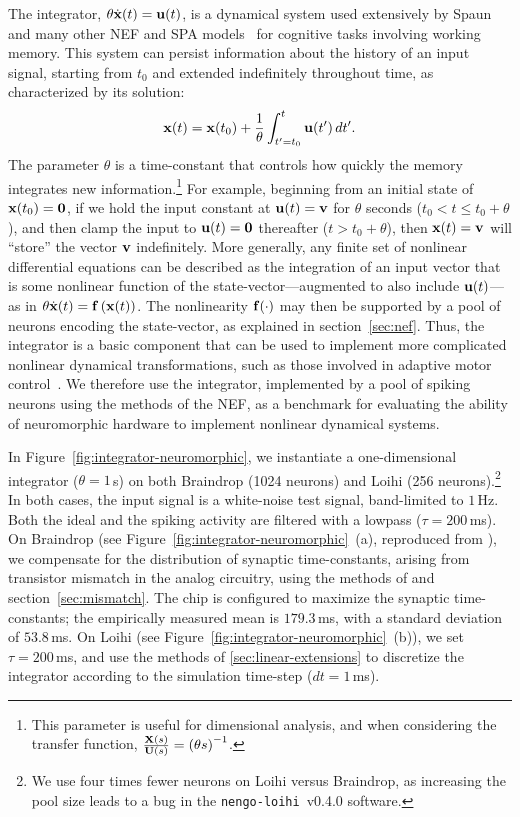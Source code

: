 The integrator, $\theta \dot{\mathbf{x}}(t) = \mathbf{u}(t)$, is a dynamical system used extensively by Spaun~\citep{eliasmith2012} and many other NEF and SPA models~\citep[][to name a few]{singh2004, trujillo2014a, rasmussen2017} for cognitive tasks involving working memory.
This system can persist information about the history of an input signal, starting from $t_0$ and extended indefinitely throughout time, as characterized by its solution:
$$\mathbf{x}(t) = \mathbf{x}(t_0) + \frac{1}{\theta} \int_{t'=t_0}^{t} \mathbf{u}(t')\, dt' \text{.}$$
The parameter $\theta$ is a time-constant that controls how quickly the memory integrates new information.\footnote{
This parameter is useful for dimensional analysis, and when considering the transfer function, $\frac{\mathbf{X}(s)}{\mathbf{U}(s)} = \left( \theta s \right)^{-1}$.}
For example, beginning from an initial state of $\mathbf{x}(t_0) = \mathbf{0}$, if we hold the input constant at $\mathbf{u}(t) = \mathbf{v}$ for $\theta$ seconds ($t_0 < t \le t_0 + \theta$), and then clamp the input to $\mathbf{u}(t) = \mathbf{0}$ thereafter ($t > t_0 + \theta$), then $\mathbf{x}(t) = \mathbf{v}$ will ``store'' the vector $\mathbf{v}$ indefinitely.
More generally, any finite set of nonlinear differential equations can be described as the integration of an input vector that is some nonlinear function of the state-vector---augmented to also include $\mathbf{u}(t)$---as in $\theta \dot{\mathbf{x}}(t) = \mathbf{f}\left({\mathbf{x}(t)}\right)$.
The nonlinearity $\mathbf{f}(\cdot)$ may then be supported by a pool of neurons encoding the state-vector, as explained in section~\ref{sec:nef}.
Thus, the integrator is a basic component that can be used to implement more complicated nonlinear dynamical transformations, such as those involved in adaptive motor control~\citep{dewolf2016}.
We therefore use the integrator, implemented by a pool of spiking neurons using the methods of the NEF, as a benchmark for evaluating the ability of neuromorphic hardware to implement nonlinear dynamical systems.

In Figure~\ref{fig:integrator-neuromorphic}, we instantiate a one-dimensional integrator ($\theta = 1$\,s) on both Braindrop (1024 neurons) and Loihi (256 neurons).\footnote{
We use four times fewer neurons on Loihi versus Braindrop, as increasing the pool size leads to a bug in the \texttt{nengo-loihi}~v0.4.0 software.}
In both cases, the input signal is a white-noise test signal, band-limited to $1$\,Hz.
Both the ideal and the spiking activity are filtered with a lowpass ($\tau = 200$\,ms).
On Braindrop (see Figure~\ref{fig:integrator-neuromorphic}~(a), reproduced from \citet[][Figure~15]{braindrop2019}), we compensate for the distribution of synaptic time-constants, arising from transistor mismatch in the analog circuitry, using the methods of \citet{voelker2017iscas} and section~\ref{sec:mismatch}.
The chip is configured to maximize the synaptic time-constants; the empirically measured mean is $179.3$\,ms, with a standard deviation of $53.8$\,ms.
On Loihi (see Figure~\ref{fig:integrator-neuromorphic}~(b)), we set $\tau = 200$\,ms, and use the methods of \ref{sec:linear-extensions} to discretize the integrator according to the simulation time-step ($dt = 1$\,ms).

